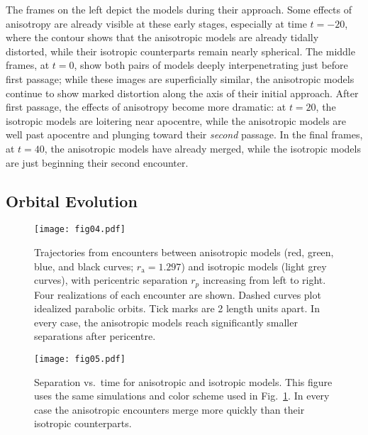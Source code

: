 \documentclass[fleqn,usenatbib]{mnras}
\begin{document}
The frames on the left depict the models during their approach. Some effects of anisotropy are already visible at these early stages, especially at time $t = -20$, where the contour shows that the anisotropic models are already tidally distorted, while their isotropic counterparts remain nearly spherical. The middle frames, at $t = 0$, show both pairs of models deeply interpenetrating just before first passage; while these images are superficially similar, the anisotropic models continue to show marked distortion along the axis of their initial approach. After first passage, the effects of anisotropy become more dramatic: at $t = 20$, the isotropic models are loitering near apocentre, while the anisotropic models are well past apocentre and plunging toward their \textit{second} passage. In the final frames, at $t = 40$, the anisotropic models have already merged, while the isotropic models are just beginning their second encounter.

\subsection{Orbital Evolution}
\label{sec:orbital_evolution}

\begin{figure*}
    \centering
    \texttt{[image: fig04.pdf]}
    \caption{Trajectories from encounters between anisotropic models (red, green, blue, and black curves; $r_\mathrm{a} = 1.297$) and isotropic models (light grey curves), with pericentric separation $r_p$ increasing from left to right. Four realizations of each encounter are shown. Dashed curves plot idealized parabolic orbits. Tick marks are 2 length units apart. In every case, the anisotropic models reach significantly smaller separations after pericentre.}
    \label{fig04}
\end{figure*}

\begin{figure*}
    \centering
    \texttt{[image: fig05.pdf]}
    \caption{Separation vs.~time for anisotropic and isotropic models. This figure uses the same simulations and color scheme used in Fig.~\ref{fig04}. In every case the anisotropic encounters merge more quickly than their isotropic counterparts. }
    \label{fig05}
\end{figure*}
\end{document}
